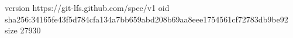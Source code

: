 version https://git-lfs.github.com/spec/v1
oid sha256:34165fe43f5d784cfa134a7bb659abd208b69aa8eee1754561cf72783db9be92
size 27930
